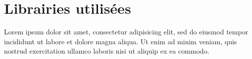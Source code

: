 \documentclass[a4paper, oneside, 12pt, final]{extreport}
\begin{document}
\section{Librairies utilisées}

Lorem ipsum dolor sit amet, consectetur adipisicing elit, sed do eiusmod
tempor incididunt ut labore et dolore magna aliqua. Ut enim ad minim veniam,
quis nostrud exercitation ullamco laboris nisi ut aliquip ex ea commodo.


\nocite{*}







%



\cleardoublepage%


\printglossaries
\end{document}
